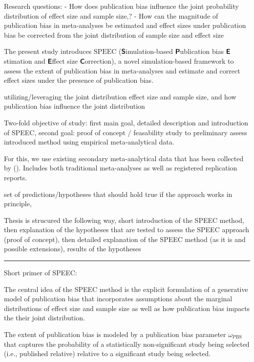 \documentclass[
  12pt,
]{scrartcl}
\newcommand{\pbs}{\omega_{\text{PBS}}}
\begin{document}
Research questions: - How does publication bias influence the joint
probability distribution of effect size and sample size‚? - How can the
magnitude of publication bias in meta-analyses be estimated and effect
sizes under publication bias be corrected from the joint distribution of
sample size and effect size

The present study introduces \(\mathrm{SPEEC}\)
(\(\mathbfsfup{S}\)imulation-based \(\mathbfsfup{P}\)ublication bias
\(\mathbfsfup{E}\)stimation and \(\mathbfsfup{E}\)ffect size
\(\mathbfsfup{C}\)orrection), a novel simulation-based framework to
assess the extent of publication bias in meta-analyses and estimate and
correct effect sizes under the presence of publication bias.

utilizing/leveraging the joint distribution effect size and sample size,
and how publication bias influence the joint distribution

Two-fold objective of study: first main goal, detailed description and
introduction of SPEEC, second goal: proof of concept / feasability study
to preliminary assess introduced method using empirical meta-analytical
data.

For this, we use existing secondary meta-analytical data that has been
collected by
().
Includes both traditional meta-analyses as well as registered
replication reports.

set of predictions/hypotheses that should hold true if the approach
works in principle,

Thesis is strucured the following way, short introduction of the SPEEC
method, then explanation of the hypotheses that are tested to assess the
SPEEC approach (proof of concept), then detailed explanation of the
SPEEC method (as it is and possible extensions), results of the
hypotheses

\begin{center}\rule{0.5\linewidth}{0.5pt}\end{center}

Short primer of SPEEC:

The central idea of the SPEEC method is the explicit formulation of a
generative model of publication bias that incorporates assumptions about
the marginal distributions of effect size and sample size as well as how
publication bias impacts the their joint distribution.

The extent of publication bias is modeled by a publication bias
parameter \(\pbs\) that captures the probability of a statistically
non-significant study being selected (i.e., published relative) relative
to a significant study being selected.
\end{document}
